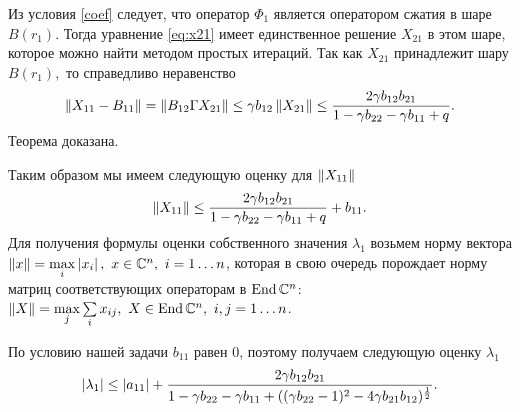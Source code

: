 Из условия \eqref{coef} следует, что оператор $\Phi_1$ является оператором сжатия в шаре $B(r_1).$ Тогда уравнение \eqref{eq:x21} имеет единственное решение $X_{21}$ в этом шаре, которое можно найти методом простых итераций. Так как $X_{21}$ принадлежит шару $B(r_1),$ то справедливо неравенство
\begin{align*}
\left\|X_{11} - B_{11}\right\| = \left\|B_{12}\Gamma X_{21}\right\| \leq \gamma b_{12} \left\|X_{21}\right\| \leq \frac{2\gamma b_{12}b_{21}}{1 - \gamma b_{22} - \gamma b_{11} + q}.
\end{align*}
Теорема доказана.

Таким образом мы имеем следующую оценку для $\left\|X_{11}\right\|$
$$
	\left\|X_{11}\right\| \leq \frac{2\gamma b_{12}b_{21}}{1 - \gamma b_{22} - \gamma b_{11} + q} + b_{11}.
$$
Для получения формулы оценки собственного значения $\lambda_1$ возьмем норму вектора $\left\|x\right\| = \max\limits_i\left|x_i\right|,\ x \in \mathbb{C}^n,\ i=1 \dots n$, которая в свою очередь порождает норму матриц соответствующих операторам в $\operatorname{End}\mathbb{C}^n$: $\left\|X\right\| = \max\limits_j\sum\limits_i x_{ij},\ X \in \operatorname{End}\mathbb{C}^n,\  i,j=1 \dots n$.

По условию нашей задачи $b_{11}$ равен 0, поэтому получаем следующую оценку $\lambda_1$
$$
	\left|\lambda_1\right| \leq \left|a_{11}\right| + \frac{2\gamma b_{12}b_{21}}{1 - \gamma b_{22} - \gamma b_{11} + ((\gamma b_{22} - 1)^2 - 4\gamma b_{21}b_{12})^{\frac{1}{2}}}.
$$



